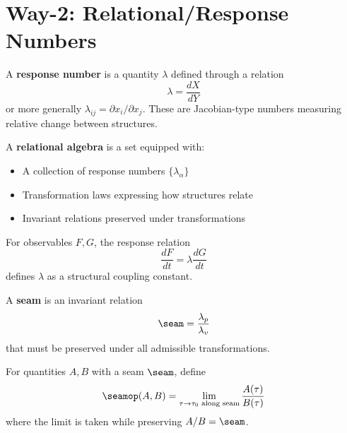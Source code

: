 \section{Way-2: Relational/Response Numbers}

\begin{definition}
A \textbf{response number} is a quantity $\lambda$ defined through a relation
\[
\lambda = \frac{dX}{dY}
\]
or more generally $\lambda_{ij} = \partial x_i / \partial x_j$. These are Jacobian-type numbers
measuring relative change between structures.
\end{definition}

\begin{definition}
A \textbf{relational algebra} is a set equipped with:
\begin{itemize}
    \item A collection of response numbers $\{\lambda_{\alpha}\}$
    \item Transformation laws expressing how structures relate
    \item Invariant relations preserved under transformations
\end{itemize}
\end{definition}

\begin{example}
For observables $F,G$, the response relation
\[
\frac{dF}{dt} = \lambda \frac{dG}{dt}
\]
defines $\lambda$ as a structural coupling constant.
\end{example}

\begin{definition}
A \textbf{seam} is an invariant relation
\[
\seam = \frac{\lambda_p}{\lambda_v}
\]
that must be preserved under all admissible transformations.
\end{definition}

\begin{definition}
For quantities $A,B$ with a seam $\seam$, define
\[
\seamop(A,B) = \lim_{\tau \to \tau_0 \text{ along seam}} \frac{A(\tau)}{B(\tau)}
\]
where the limit is taken while preserving $A/B = \seam$.
\end{definition}

